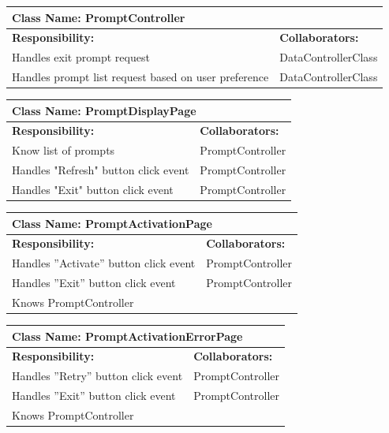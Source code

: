 \documentclass[]{article}
\begin{document}
	\begin{table}[H]
	\centering
	\begin{tabular}{|p{6cm}|p{6cm}|}
	\hline 
		\multicolumn{2}{|l|}{\textbf{Class Name: PromptController}} \\
	\hline
	\textbf{Responsibility:} & \textbf{Collaborators:} \\
	\hline
	Handles exit prompt request & DataControllerClass\\ \hline
	Handles prompt list request based on user preference & DataControllerClass\\ \hline
	\end{tabular}
	\end{table}

	\begin{table}[H]
	\centering
	\begin{tabular}{|p{6cm}|p{6cm}|}
	\hline 
		\multicolumn{2}{|l|}{\textbf{Class Name: PromptDisplayPage}} \\
	\hline
	\textbf{Responsibility:} & \textbf{Collaborators:} \\
	\hline
	Know list of prompts & PromptController\\ \hline
	Handles "Refresh" button click event  & PromptController\\ \hline
	Handles "Exit" button click event  & PromptController \\ \hline
	\end{tabular}
	\end{table}

	\begin{table}[H]
	\centering
	\begin{tabular}{|p{6cm}|p{6cm}|}
	\hline 
		\multicolumn{2}{|l|}{\textbf{Class Name: PromptActivationPage}} \\
	\hline
	\textbf{Responsibility:} & \textbf{Collaborators:} \\
	\hline
	Handles ”Activate” button click event & PromptController\\ \hline
	Handles ”Exit” button click event & PromptController\\ \hline
	Knows PromptController & \\ \hline
	\end{tabular}
	\end{table}
	
	\begin{table}[H]
	\centering
	\begin{tabular}{|p{6cm}|p{6cm}|}
	\hline 
		\multicolumn{2}{|l|}{\textbf{Class Name: PromptActivationErrorPage}} \\
	\hline
	\textbf{Responsibility:} & \textbf{Collaborators:} \\
	\hline
	Handles ”Retry” button click event & PromptController\\ \hline
	Handles ”Exit” button click event & PromptController\\ \hline
	Knows PromptController & \\ \hline
	\end{tabular}
	\end{table}
\end{document}
